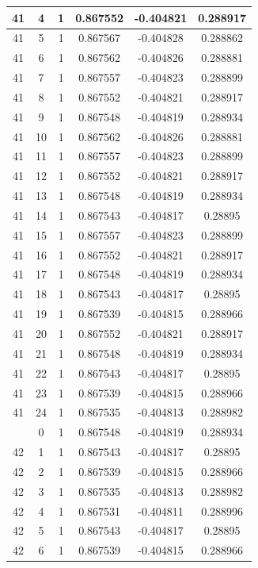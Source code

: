 \documentclass[12pt,a4paper]{article}
\numberwithin{equation}{section}
\numberwithin{figure}{section}
\numberwithin{table}{section}
\begin{document}
\begin{longtable}{|c|c|c|c|c|c|}
41 & 4 & 1 & 0.867552 & -0.404821 & 0.288917 \\ \hline
41 & 5 & 1 & 0.867567 & -0.404828 & 0.288862 \\ \hline
41 & 6 & 1 & 0.867562 & -0.404826 & 0.288881 \\ \hline
41 & 7 & 1 & 0.867557 & -0.404823 & 0.288899 \\ \hline
41 & 8 & 1 & 0.867552 & -0.404821 & 0.288917 \\ \hline
41 & 9 & 1 & 0.867548 & -0.404819 & 0.288934 \\ \hline
41 & 10 & 1 & 0.867562 & -0.404826 & 0.288881 \\ \hline
41 & 11 & 1 & 0.867557 & -0.404823 & 0.288899 \\ \hline
41 & 12 & 1 & 0.867552 & -0.404821 & 0.288917 \\ \hline
41 & 13 & 1 & 0.867548 & -0.404819 & 0.288934 \\ \hline
41 & 14 & 1 & 0.867543 & -0.404817 & 0.28895 \\ \hline
41 & 15 & 1 & 0.867557 & -0.404823 & 0.288899 \\ \hline
41 & 16 & 1 & 0.867552 & -0.404821 & 0.288917 \\ \hline
41 & 17 & 1 & 0.867548 & -0.404819 & 0.288934 \\ \hline
41 & 18 & 1 & 0.867543 & -0.404817 & 0.28895 \\ \hline
41 & 19 & 1 & 0.867539 & -0.404815 & 0.288966 \\ \hline
41 & 20 & 1 & 0.867552 & -0.404821 & 0.288917 \\ \hline
41 & 21 & 1 & 0.867548 & -0.404819 & 0.288934 \\ \hline
41 & 22 & 1 & 0.867543 & -0.404817 & 0.28895 \\ \hline
41 & 23 & 1 & 0.867539 & -0.404815 & 0.288966 \\ \hline
41 & 24 & 1 & 0.867535 & -0.404813 & 0.288982 \\ \hline
\pagebreak
42 & 0 & 1 & 0.867548 & -0.404819 & 0.288934 \\ \hline
42 & 1 & 1 & 0.867543 & -0.404817 & 0.28895 \\ \hline
42 & 2 & 1 & 0.867539 & -0.404815 & 0.288966 \\ \hline
42 & 3 & 1 & 0.867535 & -0.404813 & 0.288982 \\ \hline
42 & 4 & 1 & 0.867531 & -0.404811 & 0.288996 \\ \hline
42 & 5 & 1 & 0.867543 & -0.404817 & 0.28895 \\ \hline
42 & 6 & 1 & 0.867539 & -0.404815 & 0.288966 \\ \hline

\end{longtable}
\end{document}
